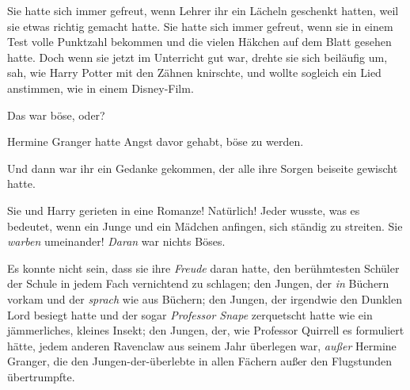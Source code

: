 Sie hatte sich immer gefreut, wenn Lehrer ihr ein Lächeln geschenkt hatten, weil sie etwas richtig gemacht hatte. Sie hatte sich immer gefreut, wenn sie in einem Test volle Punktzahl bekommen und die vielen Häkchen auf dem Blatt gesehen hatte. Doch wenn sie jetzt im Unterricht gut war, drehte sie sich beiläufig um, sah, wie Harry Potter mit den Zähnen knirschte, und wollte sogleich ein Lied anstimmen, wie in einem Disney-Film.

Das war böse, oder?

Hermine Granger hatte Angst davor gehabt, böse zu werden.

Und dann war ihr ein Gedanke gekommen, der alle ihre Sorgen beiseite gewischt hatte.

Sie und Harry gerieten in eine Romanze! Natürlich! Jeder wusste, was es bedeutet, wenn ein Junge und ein Mädchen anfingen, sich ständig zu streiten. Sie \emph{warben} umeinander! \emph{Daran} war nichts Böses.

Es konnte nicht sein, dass sie ihre \emph{Freude} daran hatte, den berühmtesten Schüler der Schule in jedem Fach vernichtend zu schlagen; den Jungen, der \emph{in} Büchern vorkam und der \emph{sprach} wie aus Büchern; den Jungen, der irgendwie den Dunklen Lord besiegt hatte und der sogar \emph{Professor Snape} zerquetscht hatte wie ein jämmerliches, kleines Insekt; den Jungen, der, wie Professor Quirrell es formuliert hätte, jedem anderen Ravenclaw aus seinem Jahr überlegen war, \emph{außer} Hermine Granger, die den Jungen-der-überlebte in allen Fächern außer den Flugstunden übertrumpfte.

